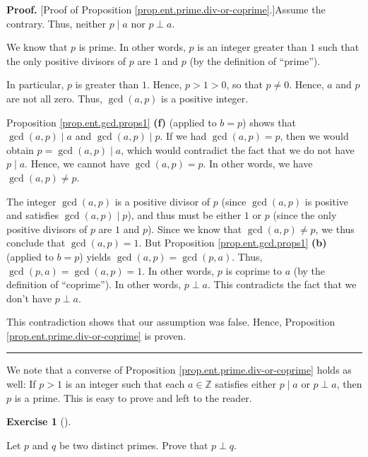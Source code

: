 \documentclass[numbers=enddot,12pt,final,onecolumn,notitlepage]{scrartcl}%
\newcounter{exer}
\numberwithin{exer}{subsection}
\theoremstyle{definition}
\newtheorem{exmp}[exer]{Exercise}
\newenvironment{exercise}[1][]
{\begin{exmp}[#1]\begin{leftbar}}
{\end{leftbar}\end{exmp}}
\newenvironment{proof}[1][Proof]{\noindent\textbf{#1.} }{\ \rule{0.5em}{0.5em}}
\begin{document}
\begin{proof}
[Proof of Proposition \ref{prop.ent.prime.div-or-coprime}.]Assume the
contrary. Thus, neither $p\mid a$ nor $p\perp a$.

We know that $p$ is prime. In other words, $p$ is an integer greater than $1$
such that the only positive divisors of $p$ are $1$ and $p$ (by the definition
of \textquotedblleft prime\textquotedblright).

In particular, $p$ is greater than $1$. Hence, $p>1>0$, so that $p\neq0$.
Hence, $a$ and $p$ are not all zero. Thus, $\gcd\left(  a,p\right)  $ is a
positive integer.

Proposition \ref{prop.ent.gcd.props1} \textbf{(f)} (applied to $b=p$) shows
that $\gcd\left(  a,p\right)  \mid a$ and $\gcd\left(  a,p\right)  \mid p$. If
we had $\gcd\left(  a,p\right)  =p$, then we would obtain $p=\gcd\left(
a,p\right)  \mid a$, which would contradict the fact that we do not have
$p\mid a$. Hence, we cannot have $\gcd\left(  a,p\right)  =p$. In other words,
we have $\gcd\left(  a,p\right)  \neq p$.

The integer $\gcd\left(  a,p\right)  $ is a positive divisor of $p$ (since
$\gcd\left(  a,p\right)  $ is positive and satisfies $\gcd\left(  a,p\right)
\mid p$), and thus must be either $1$ or $p$ (since the only positive divisors
of $p$ are $1$ and $p$). Since we know that $\gcd\left(  a,p\right)  \neq p$,
we thus conclude that $\gcd\left(  a,p\right)  =1$. But Proposition
\ref{prop.ent.gcd.props1} \textbf{(b)} (applied to $b=p$) yields $\gcd\left(
a,p\right)  =\gcd\left(  p,a\right)  $. Thus, $\gcd\left(  p,a\right)
=\gcd\left(  a,p\right)  =1$. In other words, $p$ is coprime to $a$ (by the
definition of \textquotedblleft coprime\textquotedblright). In other words,
$p\perp a$. This contradicts the fact that we don't have $p\perp a$.

This contradiction shows that our assumption was false. Hence, Proposition
\ref{prop.ent.prime.div-or-coprime} is proven.
\end{proof}

We note that a converse of Proposition \ref{prop.ent.prime.div-or-coprime}
holds as well: If $p>1$ is an integer such that each $a\in\mathbb{Z}$
satisfies either $p\mid a$ or $p\perp a$, then $p$ is a prime. This is easy to
prove and left to the reader.

\begin{exercise}
\label{exe.ent.prime.dist=cop}Let $p$ and $q$ be two distinct primes. Prove
that $p\perp q$.
\end{exercise}
\end{document}
